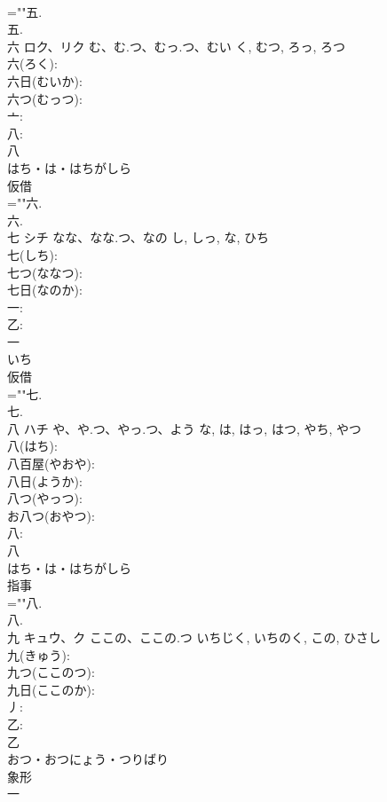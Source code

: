 \documentclass[8pt]{extreport}
\begin{document}
\begin{CJK}{UTF8}{min}
\\	=""五.
\\	五.
\\	六	ロク、リク	む、む.つ、むっ.つ、むい	く, むつ, ろっ, ろつ	
\\	六(ろく): 
\\	六日(むいか): 
\\	六つ(むっつ): 
\\	亠: 
\\	八: 
\\	八	
\\	はち・は・はちがしら	
\\	仮借 
\\	=""六.
\\	六.
\\	七	シチ	なな、なな.つ、なの	し, しっ, な, ひち	
\\	七(しち): 
\\	七つ(ななつ): 
\\	七日(なのか): 
\\	一: 
\\	乙: 
\\	一	
\\	いち	
\\	仮借 
\\	=""七.
\\	七.
\\	八	ハチ	や、や.つ、やっ.つ、よう	な, は, はっ, はつ, やち, やつ	
\\	八(はち): 
\\	八百屋(やおや): 
\\	八日(ようか): 
\\	八つ(やっつ): 
\\	お八つ(おやつ): 
\\	八: 
\\	八	
\\	はち・は・はちがしら	
\\	指事 
\\	=""八.
\\	八.
\\	九	キュウ、ク	ここの、ここの.つ	いちじく, いちのく, この, ひさし	
\\	九(きゅう): 
\\	九つ(ここのつ): 
\\	九日(ここのか): 
\\	丿: 
\\	乙: 
\\	乙	
\\	おつ・おつにょう・つりばり	
\\	象形 
\\	一 

\end{CJK}
\end{document}
